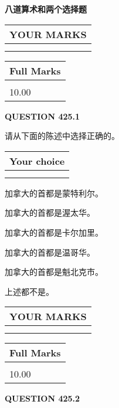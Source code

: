 \documentclass{ctexart}
\begin{document}
   
 \vspace{0.2in}
{\LARGE {\textbf{ 八道算术和两个选择题}}}
   
   
  
\vspace{0.2in}
  
\noindent\begin{tabular}{|l|}
\hline
 YOUR MARKS  \\
\hline
 \\ 
 \\ 
\hline
\end{tabular}
\hspace{0.05in} \begin{tabular}{|l|}
\hline
 Full Marks  \\
\hline
 \\ 
10.00 \\
\hline
\end{tabular}
{\textbf{\Large{QUESTION
425.1 
}}}
  
  
请从下面的陈述中选择正确的。
  
  
\noindent\hspace{3.0in} \begin{tabular}{|l|}
\hline
Your choice \\
\hline
 \\ 
 \\ 
\hline
\end{tabular}
  
  
 
 
加拿大的首都是蒙特利尔。
 
 
加拿大的首都是渥太华。
 
 
加拿大的首都是卡尔加里。
 
 
加拿大的首都是温哥华。
 
 
加拿大的首都是魁北克市。
 
 
 上述都不是。
 
 
  
\vspace{0.2in}
  
\noindent\begin{tabular}{|l|}
\hline
 YOUR MARKS  \\
\hline
 \\ 
 \\ 
\hline
\end{tabular}
\hspace{0.05in} \begin{tabular}{|l|}
\hline
 Full Marks  \\
\hline
 \\ 
10.00 \\
\hline
\end{tabular}
{\textbf{\Large{QUESTION
425.2 
}}}
  
\end{document}
